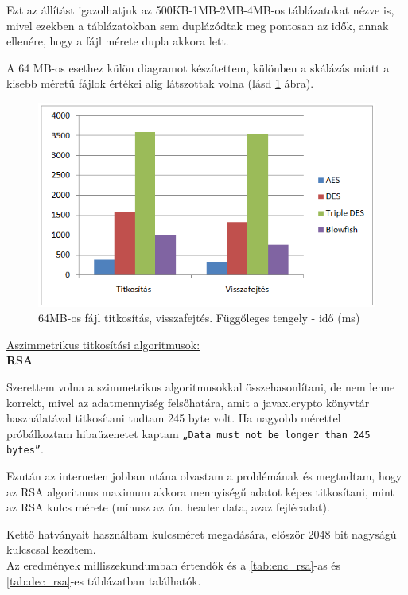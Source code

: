Ezt az állítást igazolhatjuk az 500KB-1MB-2MB-4MB-os táblázatokat nézve is, mivel ezekben a táblázatokban sem duplázódtak meg pontosan az idők, annak ellenére, hogy a fájl mérete dupla akkora lett.

A 64 MB-os esethez külön diagramot készítettem, különben a skálázás miatt a kisebb méretű fájlok értékei alig látszottak volna (lásd \ref{fig:alg_64mb_graf} ábra).
\begin{figure}[h]
	\centering
	\includegraphics[scale=0.8]{images/alg_graf_3.png}
	\caption{64MB-os fájl titkosítás, visszafejtés. Függőleges tengely - idő (ms)}
	\label{fig:alg_64mb_graf}
\end{figure}

\vspace{25pt} \noindent \underline{Aszimmetrikus titkosítási algoritmusok:}
\\ \textbf{RSA}

Szerettem volna a szimmetrikus algoritmusokkal összehasonlítani, de nem lenne korrekt, mivel az adatmennyiség felsőhatára, amit a javax.crypto könyvtár használatával titkosítani tudtam 245 byte volt. Ha nagyobb mérettel próbálkoztam hibaüzenetet kaptam \texttt{„Data must not be longer than 245 bytes”}.

Ezután az interneten jobban utána olvastam a problémának és megtudtam, hogy az RSA algoritmus maximum akkora mennyiségű adatot képes titkosítani, mint az RSA kulcs mérete (mínusz az ún. header data, azaz fejlécadat). 

Kettő hatványait használtam kulcsméret megadására, először 2048 bit nagy\-sá\-gú kulcs\-csal kezdtem.
\\Az eredmények milliszekundumban értendők és a \ref{tab:enc_rsa}-as és \ref{tab:dec_rsa}-es táblázatban találhatók.

